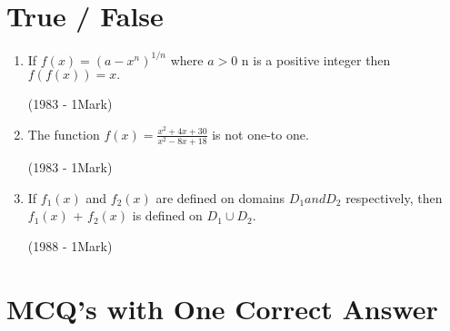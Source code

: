 \documentclass[journal,12pt,twocolumn]{IEEEtran}
\theoremstyle{remark}
\begin{document}
\section{ True / False}




\begin{enumerate}

\item If $f(x)=(a-x^n)^{1/n}$ where $a>0$ n is a positive integer 
then $f(f(x))=x.$


 \hfill
 {(1983 - 1Mark)}


 
\item The function $f(x)={\frac{x^2+4x+30}{x^2-8x+18}}$ is not one-to one.


\hfill
{(1983 - 1Mark)}




\item If $f{_1}(x)$
 and  $f{_2}(x)$ are  defined on domains $D{_1} and D{_2}$ respectively, then $f{_1}(x)$ + $f{_2}(x)$ is defined on $D{_1}\cup D{_2}$.


\hfill
{(1988 - 1Mark)}
\end{enumerate}




\section{ MCQ's with One Correct Answer}



 
\end{document}

